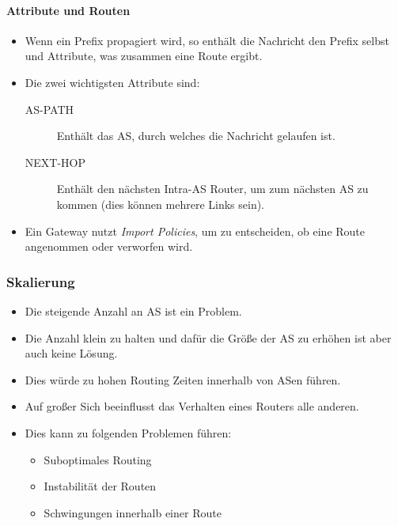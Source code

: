 			\paragraph{Attribute und Routen}
				\begin{itemize}
					\item Wenn ein Prefix propagiert wird, so enthält die Nachricht den Prefix selbst und Attribute, was zusammen eine Route ergibt.
					\item Die zwei wichtigsten Attribute sind:
						\begin{description}
							\item[AS-PATH] Enthält das AS, durch welches die Nachricht gelaufen ist.
							\item[NEXT-HOP] Enthält den nächsten Intra-AS Router, um zum nächsten AS zu kommen (dies können mehrere Links sein).
						\end{description}
					\item Ein Gateway nutzt \textit{Import Policies}, um zu entscheiden, ob eine Route angenommen oder verworfen wird.
				\end{itemize}

			\subsubsection{Skalierung}
				\begin{itemize}
					\item Die steigende Anzahl an AS ist ein Problem.
					\item Die Anzahl klein zu halten und dafür die Größe der AS zu erhöhen ist aber auch keine Lösung.
					\item Dies würde zu hohen Routing Zeiten innerhalb von ASen führen.
					\item Auf großer Sich beeinflusst das Verhalten eines Routers alle anderen.
					\item Dies kann zu folgenden Problemen führen:
						\begin{itemize}
							\item Suboptimales Routing
							\item Instabilität der Routen
							\item Schwingungen innerhalb einer Route
						\end{itemize}
				\end{itemize}

